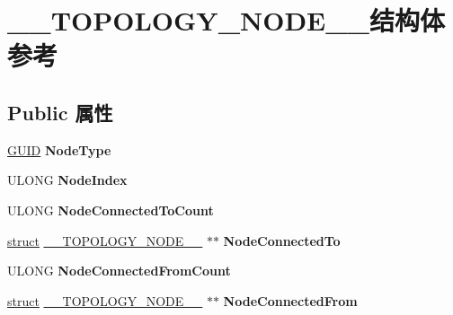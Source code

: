 \hypertarget{struct_____t_o_p_o_l_o_g_y___n_o_d_e____}{}\section{\+\_\+\+\_\+\+T\+O\+P\+O\+L\+O\+G\+Y\+\_\+\+N\+O\+D\+E\+\_\+\+\_\+结构体 参考}
\label{struct_____t_o_p_o_l_o_g_y___n_o_d_e____}
\subsection*{Public 属性}
\begin{DoxyCompactItemize}
\item 
\mbox{\label{struct_____t_o_p_o_l_o_g_y___n_o_d_e_____a9155e7a627f6eeb11d8d8e0c948b9021}} 
\hyperlink{interface_g_u_i_d}{G\+U\+ID} {\bfseries Node\+Type}
\item 
\mbox{\label{struct_____t_o_p_o_l_o_g_y___n_o_d_e_____a81f325a4de700b247c9c74c5c24fb19a}} 
U\+L\+O\+NG {\bfseries Node\+Index}
\item 
\mbox{\label{struct_____t_o_p_o_l_o_g_y___n_o_d_e_____a62e170543548622da17b56ecbd565a4a}} 
U\+L\+O\+NG {\bfseries Node\+Connected\+To\+Count}
\item 
\mbox{\label{struct_____t_o_p_o_l_o_g_y___n_o_d_e_____af711c69aaf795e31129ecd01d77f6de2}} 
\hyperlink{interfacestruct}{struct} \hyperlink{struct_____t_o_p_o_l_o_g_y___n_o_d_e____}{\+\_\+\+\_\+\+T\+O\+P\+O\+L\+O\+G\+Y\+\_\+\+N\+O\+D\+E\+\_\+\+\_\+} $\ast$$\ast$ {\bfseries Node\+Connected\+To}
\item 
\mbox{\label{struct_____t_o_p_o_l_o_g_y___n_o_d_e_____a4249343a1d353bfa6b289cb1d1cc9345}} 
U\+L\+O\+NG {\bfseries Node\+Connected\+From\+Count}
\item 
\mbox{\label{struct_____t_o_p_o_l_o_g_y___n_o_d_e_____a4c5636b673342942a9c7b2530a64a542}} 
\hyperlink{interfacestruct}{struct} \hyperlink{struct_____t_o_p_o_l_o_g_y___n_o_d_e____}{\+\_\+\+\_\+\+T\+O\+P\+O\+L\+O\+G\+Y\+\_\+\+N\+O\+D\+E\+\_\+\+\_\+} $\ast$$\ast$ {\bfseries Node\+Connected\+From}

\end{DoxyCompactItemize}
